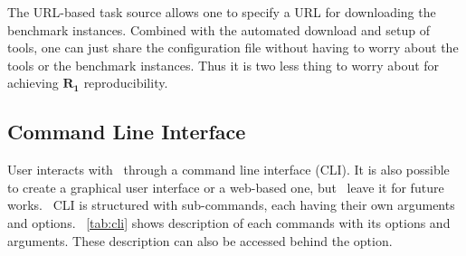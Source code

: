 The URL-based task source allows one to specify a URL for downloading the benchmark instances.
Combined with the automated download and setup of tools, one can just share the configuration file without having to worry about the tools or the benchmark instances.
Thus it is two less thing to worry about for achieving \(\bm{R_1}\) reproducibility.


\subsection{Command Line Interface}

User interacts with \OurBenchmarkingTool~through a command line interface (CLI).
It is also possible to create a graphical user interface or a web-based one, but \first~leave it for future works.
\OurBenchmarkingTool~CLI is structured with sub-commands, each having their own arguments and options.
\tab~\ref{tab:cli} shows description of each commands with its options and arguments.
These description can also be accessed behind the  option.

